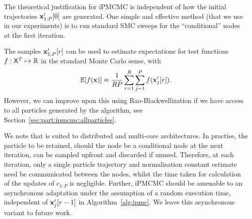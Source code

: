 The theoretical justification for iPMCMC is independent of how the initial trajectories $\mathbf{x}_{1:P}'[0]$ are generated.  One simple and effective method (that we use in our experiments) is to run standard SMC sweeps for the ``conditional'' nodes at the first iteration.

The \ipmc samples $\mathbf{x}_{1:P}'[r]$ can be used to estimate expectations for test functions $f: \mathsf{X}^T \mapsto \mathbb{R}$ in the standard Monte Carlo sense, with
\begin{align}
\label{eq:mcestimate}
\mathbb{E}[f(\mathbf{x})] \approx \frac{1}{RP}\sum_{r=1}^R\sum_{j=1}^P f(\mathbf{x}_j'[r]).
\end{align}
However, we can improve upon this using Rao-Blackwellization if we have access to all particles generated by the algorithm, 
see Section~\ref{sec:part:ipmcmc:allparticles}.

We note that \ipmcmc is suited to distributed and multi-core architectures. In practise, the particle to be retained, should the node be a conditional node at the next iteration, can be sampled upfront and discarded if unused.  Therefore, at each iteration, only a single particle trajectory and normalisation constant estimate need be communicated between the nodes, whilst the time taken for calculation of the updates of $c_{1:P}$ is negligible.  Further, iPMCMC should be amenable to an asynchronous adaptation under the assumption of a random execution time, independent of $\mathbf{x}_j'[r-1]$ in Algorithm~\ref{alg:ipmc}. We leave this asynchronous variant to future work.



